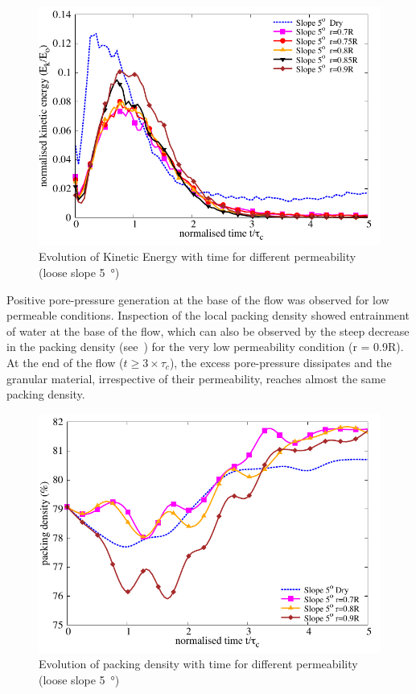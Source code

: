 \begin{figure}
\centering
\includegraphics[width=0.97\columnwidth]{KE_loose_5}
\caption{Evolution of Kinetic Energy with time for different permeability (loose slope \SI{5}{\degree})}
\label{fig:KE5}
\end{figure}

Positive pore-pressure generation at the base of the flow was observed for low 
permeable conditions. Inspection of the local packing density showed 
entrainment of water at the base of the flow, which can also be observed by the 
steep decrease in the packing density (see~) for the very low 
permeability condition (r = 0.9R). At the end of the flow ($t \ge 3 \times 
\tau_c$), the excess pore-pressure dissipates and the granular material, 
irrespective of their permeability, reaches almost the same packing density.

\begin{figure}
\centering
\includegraphics[width=0.97\columnwidth]{Voronoi_5}
\caption{Evolution of packing density with time for different permeability (loose slope \SI{5}{\degree})}
\label{fig:voro5}
\end{figure}


